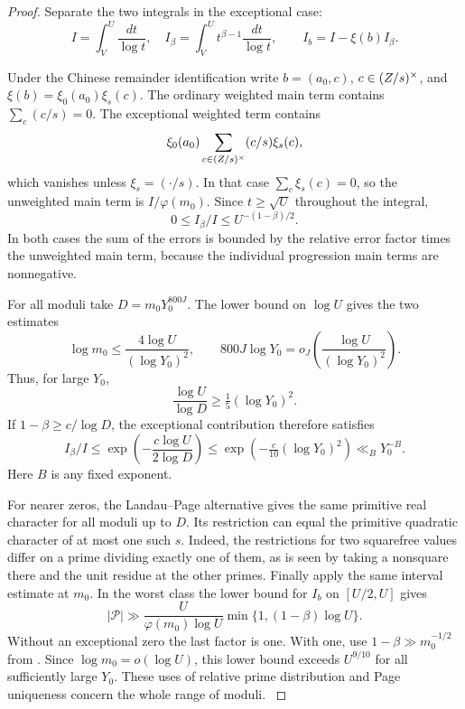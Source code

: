 \begin{proof}
Separate the two integrals in the exceptional case:
\[
 I=\int_V^U\frac{dt}{\log t},\quad I_\beta=\int_V^U t^{\beta-1}\frac{dt}{\log t},
 \qquad I_b=I-\xi(b)I_\beta .
\]

Under the Chinese remainder identification write
\(b=(a_0,c)\), \(c\in(Z/s)^\times\), and
\(\xi(b)=\xi_0(a_0)\xi_s(c)\). The ordinary weighted
main term contains \(\sum_c(c/s)=0\). The exceptional
weighted term contains
\[
   \xi_0(a_0)\sum_{c\in(Z/s)^\times}(c/s)\xi_s(c),
\]
which vanishes unless \(\xi_s=(\cdot/s)\). In that case
\(\sum_c\xi_s(c)=0\), so the unweighted main term is \(I/\varphi(m_0)\). Since \(t\ge\sqrt U\) throughout the integral,
\[
  0\le I_\beta/I\le U^{-(1-\beta)/2}.
\]
In both cases the sum of the errors is bounded by the
relative error factor times the unweighted main term,
because the individual progression main terms are nonnegative.


For all moduli take \(D=m_0Y_0^{800J}\). The lower bound on
\(\log U\) gives the two estimates
\[
 \log m_0\le\frac{4\log U}{(\log Y_0)^2},\qquad
 800J\log Y_0=o_J\!\left(\frac{\log U}{(\log Y_0)^2}\right).
\]
Thus, for large \(Y_0\),
\[
       \frac{\log U}{\log D}\ge\tfrac15(\log Y_0)^2 .
\]
If \(1-\beta\ge c/\log D\), the exceptional contribution therefore satisfies
\[
 I_\beta/I\le\exp\!\left(-\frac{c\log U}{2\log D}\right)
     \le \exp\!\left(-\tfrac c{10}(\log Y_0)^2\right)\ll_B Y_0^{-B}.
\]
Here \(B\) is any fixed exponent.

For nearer zeros, the Landau--Page alternative gives the same
primitive real character for all moduli up to \(D\).
Its restriction can equal the primitive quadratic character of
at most one such \(s\). Indeed, the restrictions for two squarefree
values differ on a prime dividing exactly one of them, as is seen
by taking a nonsquare there and the unit residue at the other primes.
Finally apply the same interval estimate at \(m_0\).
In the worst class the lower bound for \(I_b\) on \([U/2,U]\) gives
\[
 |\mathcal P|\gg\frac{U}{\varphi(m_0)\log U}
                 \min\{1,(1-\beta)\log U\}.
\]
Without an exceptional zero the last factor is one. With one, use
\(1-\beta\gg m_0^{-1/2}\) from \cite[(1.2), with exponent \(1/2\)]{thorner-zaman}.
Since \(\log m_0=o(\log U)\), this lower bound exceeds \(U^{9/10}\) for all sufficiently large \(Y_0\). These uses of relative prime
distribution and Page uniqueness concern the whole range of moduli.
\hfill\mbox{\cite{page,thorner-zaman}}\label{cor:cohomology-host-windows-1}

\end{proof}

